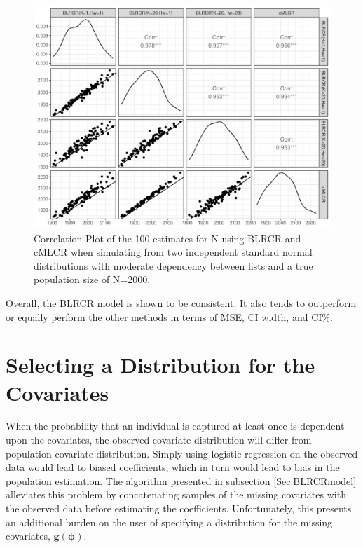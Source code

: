 \documentclass[
  12pt,
]{article}
\begin{document}
\begin{figure}[H]

{\centering \includegraphics{dissertationmain_files/figure-latex/plotNvalues-1} 

}

\caption{\label{fig:normalx} Correlation Plot of the 100 estimates for N using BLRCR and cMLCR when simulating from two independent standard normal distributions with moderate dependency between lists and a true population size of N=2000.}\label{fig:plotNvalues}
\end{figure}

Overall, the BLRCR model is shown to be consistent. It also tends to
outperform or equally perform the other methods in terms of MSE, CI
width, and CI\(\%\).

\section{Selecting a Distribution for the Covariates}
\label{Sec:selectcovariates}

When the probability that an individual is captured at least once is
dependent upon the covariates, the observed covariate distribution will
differ from population covariate distribution. Simply using logistic
regression on the observed data would lead to biased coefficients, which
in turn would lead to bias in the population estimation. The algorithm
presented in subsection \ref{Sec:BLRCRmodel} alleviates this problem by
concatenating samples of the missing covariates with the observed data
before estimating the coefficients. Unfortunately, this presents an
additional burden on the user of specifying a distribution for the
missing covariates, \(\boldsymbol{g}(\boldsymbol{\phi})\).
\end{document}
